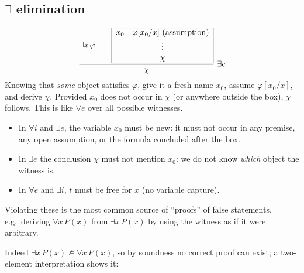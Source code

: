 \subsection{\texorpdfstring{$\exists$}{exists} elimination}
\[
  \dfrac{\exists x\,\varphi\qquad
  \begin{array}{|c|}\hline x_0\quad \varphi[x_0/x]\ \text{(assumption)}\\ \vdots\\ \chi\\\hline\end{array}}
  {\chi}\ \exists e
\]
Knowing that \emph{some} object satisfies $\varphi$, give it a fresh name $x_0$, assume
$\varphi[x_0/x]$, and derive $\chi$. Provided $x_0$ does not occur in $\chi$ (or anywhere
outside the box), $\chi$ follows. This is like $\lor e$ over all possible witnesses.

\begin{important}
\begin{itemize}
  \item In $\forall i$ and $\exists e$, the variable $x_0$ must be new: it must not occur
        in any premise, any open assumption, or the formula concluded after the box.
  \item In $\exists e$ the conclusion $\chi$ must not mention $x_0$: we do not know
        \emph{which} object the witness is.
  \item In $\forall e$ and $\exists i$, $t$ must be free for $x$ (no variable capture).
\end{itemize}
Violating these is the most common source of ``proofs'' of false statements, e.g.\
deriving $\forall x\,P(x)$ from $\exists x\,P(x)$ by using the witness as if it were
arbitrary.
\end{important}
Indeed $\exists x\,P(x)\not\models\forall x\,P(x)$, so by soundness no correct proof can
exist; a two-element interpretation shows it:
\begin{center}
\end{center}

